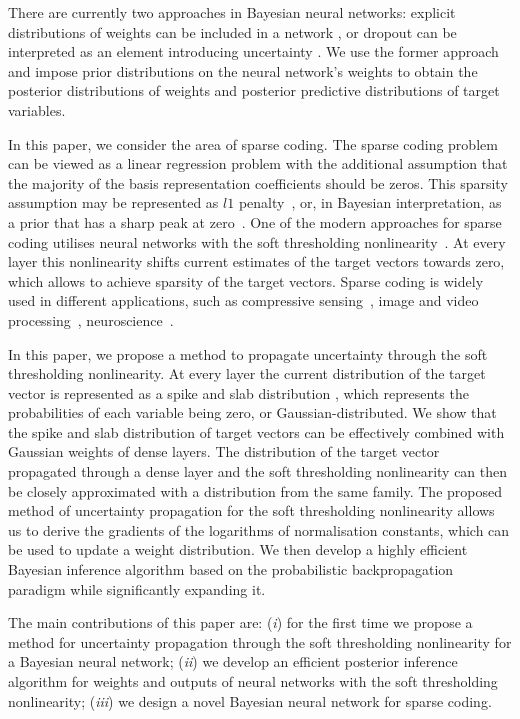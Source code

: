 \documentclass{article}
\begin{document}
  There are currently two approaches in Bayesian neural networks: explicit distributions of weights can be included in a network \cite{hernandez2015probabilistic, ranganath2015deep}, or dropout can be interpreted as an element introducing uncertainty \cite{gal2016dropout}. We use the former approach and impose prior distributions on the neural network's weights to obtain the posterior distributions of weights and posterior predictive distributions of target variables.

  In this paper, we consider the area of sparse coding. The sparse coding problem can be viewed as a linear regression problem with the additional assumption that the majority of the basis representation coefficients should be zeros. This sparsity assumption may be represented as $l1$ penalty~\cite{tibshirani1996regression}, or, in Bayesian interpretation, as a prior that has a sharp peak at zero~\cite{tipping2001sparse}. One of the modern approaches for sparse coding utilises neural networks with the soft thresholding nonlinearity~\cite{gregor2010learning, sprechmann2015learning}. At every layer this nonlinearity shifts current estimates of the target vectors towards zero, which allows to achieve sparsity of the target vectors. Sparse coding is widely used in different applications, such as compressive sensing~\cite{candes2008introduction}, image and video processing~\cite{mairal2014sparse, wang2015deep}, neuroscience~\cite{baillet1997bayesian, jas2017learning}.

  In this paper, we propose a method to propagate uncertainty through the soft thresholding nonlinearity. At every layer the current distribution of the target vector is represented as a spike and slab distribution \cite{mitchell1988bayesian}, which represents the probabilities of each variable being zero, or Gaussian-distributed. We show that the spike and slab distribution of target vectors can be effectively combined with Gaussian weights of dense layers. The distribution of the target vector propagated through a dense layer and the soft thresholding nonlinearity can then be closely approximated with a distribution from the same family. The proposed method of uncertainty propagation for the soft thresholding nonlinearity allows us to derive the gradients of the logarithms of normalisation constants, which can be used to update a weight distribution. We then develop a highly efficient Bayesian inference algorithm based on the probabilistic backpropagation paradigm while significantly expanding it.

  The main contributions of this paper are: (\textit{i}) for the first time we propose a method for uncertainty propagation through the soft thresholding nonlinearity for a Bayesian neural network; (\textit{ii}) we develop an efficient posterior inference algorithm for weights and outputs of neural networks with the soft thresholding nonlinearity; (\textit{iii}) we design a novel Bayesian neural network for sparse coding.
\end{document}
